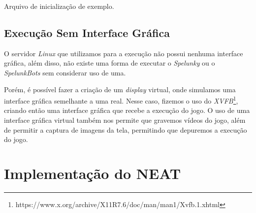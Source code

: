 \begin{algorithm}[H]

\caption[Arquivo de inicialização de exemplo.]
{\label{alg:ini-file}Arquivo de inicialização de exemplo.}
\end{algorithm}

\subsection{Execução Sem Interface Gráfica}

O servidor \textit{Linux} que utilizamos para a execução não possui nenhuma
interface gráfica, além disso, não existe uma forma de executar o
\textit{Spelunky} ou o \textit{SpelunkBots} sem considerar uso de uma.

Porém, é possível fazer a criação de um \textit{display} virtual, onde
simulamos uma interface gráfica semelhante a uma real. Nesse caso, fizemos o
uso do
\textit{XVFB}\footnote{https://www.x.org/archive/X11R7.6/doc/man/man1/Xvfb.1.xhtml},
criando então uma interface gráfica que recebe a execução do jogo. O uso de uma
interface gráfica virtual também nos permite que gravemos vídeos do jogo, além
de permitir a captura de imagens da tela, permitindo que depuremos a execução
do jogo.

\section{\label{section:neat-details}Implementação do NEAT}


